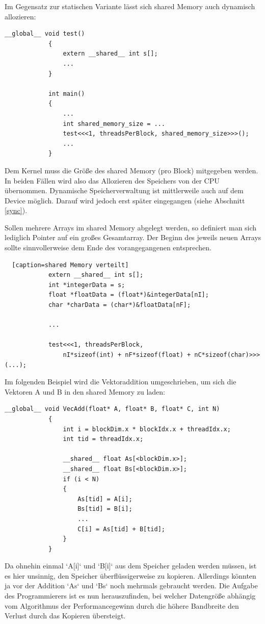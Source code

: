 		Im Gegensatz zur statischen Variante lässt sich \gls{shared Memory} auch dynamisch allozieren:  		
  		\begin{lstlisting}[caption=shared Memory dynamisch]
			__global__ void test()
			{
  				extern __shared__ int s[];
  				...
			}
			
			int main()
			{
				...
				int shared_memory_size = ...
				test<<<1, threadsPerBlock, shared_memory_size>>>();
				...
			}			
  		\end{lstlisting}
  		
        Dem \Gls{Kernel} muss die Größe des \gls{shared Memory} (pro \Gls{Block}) mitgegeben werden. In beiden Fällen wird also das Allozieren des Speichers von der CPU übernommen.  Dynamische Speicherverwaltung ist mittlerweile auch auf dem Device möglich. Darauf wird jedoch erst später eingegangen (siehe Abschnitt \ref{sync}). 
        
        Sollen mehrere Arrays im \gls{shared Memory} abgelegt werden, so definiert man sich lediglich Pointer auf ein großes Gesamtarray. Der Beginn des jeweils neuen Arrays sollte sinnvollerweise dem Ende des vorangegangenen entsprechen.  	  		
  		\begin{lstlisting}	[caption=shared Memory verteilt]	
			extern __shared__ int s[];
			int *integerData = s;                        
			float *floatData = (float*)&integerData[nI];
			char *charData = (char*)&floatData[nF];
			
			...
			
			test<<<1, threadsPerBlock, 
				nI*sizeof(int) + nF*sizeof(float) + nC*sizeof(char)>>>(...);
		\end{lstlisting}

		Im folgenden Beispiel wird die Vektoraddition umgeschrieben, um sich die Vektoren A und B in den \gls{shared Memory} zu laden:	
		
		\begin{lstlisting}[caption=Vektoraddition shared Memory]
			__global__ void VecAdd(float* A, float* B, float* C, int N)
			{
    			int i = blockDim.x * blockIdx.x + threadIdx.x;
    			int tid = threadIdx.x;
    			
    			__shared__ float As[<blockDim.x>];
    			__shared__ float Bs[<blockDim.x>]; 			
    			if (i < N)
    			{
    			    As[tid] = A[i];
    			    Bs[tid] = B[i];  
    			    ...	    
        			C[i] = As[tid] + B[tid];
        		}
			}
		\end{lstlisting}
		
		Da ohnehin einmal \li`A[i]` und \li`B[i]` aus dem Speicher geladen werden müssen, ist es hier unsinnig, den Speicher überflüssigerweise zu kopieren. Allerdings könnten ja vor der Addition \li`As` und \li`Bs` noch mehrmals gebraucht werden. Die Aufgabe des Programmierers ist es nun herauszufinden, bei welcher Datengröße abhängig vom Algorithmus der \Gls{Performance}gewinn durch die höhere Bandbreite den Verlust durch das Kopieren übersteigt.
		
